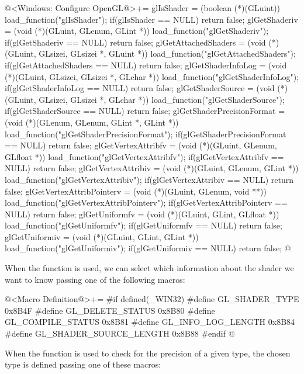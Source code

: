 \iniciocodigo
@<Windows: Configure OpenGL@>+=
glIsShader = (boolean (*)(GLuint)) load_function("glIsShader");
if(glIsShader == NULL) return false;
glGetShaderiv = (void (*)(GLuint, GLenum, GLint *))
                   load_function("glGetShaderiv");
if(glGetShaderiv == NULL) return false;
glGetAttachedShaders = (void (*)(GLuint, GLsizei, GLsizei *, GLuint *))
                         load_function("glGetAttachedShaders");
if(glGetAttachedShaders == NULL) return false;
glGetShaderInfoLog = (void (*)(GLuint, GLsizei, GLsizei *, GLchar *))
                         load_function("glGetShaderInfoLog");
if(glGetShaderInfoLog == NULL)  return false;
glGetShaderSource = (void (*)(GLuint, GLsizei, GLsizei *, GLchar *))
                       load_function("glGetShaderSource");
if(glGetShaderSource == NULL) return false;
glGetShaderPrecisionFormat = (void (*)(GLenum, GLenum, GLint *, GLint *))
                                load_function("glGetShaderPrecisionFormat");
if(glGetShaderPrecisionFormat == NULL) return false;
glGetVertexAttribfv = (void (*)(GLuint, GLenum, GLfloat *))
                         load_function("glGetVertexAttribfv");
if(glGetVertexAttribfv == NULL) return false;
glGetVertexAttribiv = (void (*)(GLuint, GLenum, GLint *))
                        load_function("glGetVertexAttribiv");
if(glGetVertexAttribiv == NULL) return false;
glGetVertexAttribPointerv = (void (*)(GLuint, GLenum, void **))
                               load_function("glGetVertexAttribPointerv");
if(glGetVertexAttribPointerv == NULL) return false;
glGetUniformfv = (void (*)(GLuint, GLint, GLfloat *))
                     load_function("glGetUniformfv");
if(glGetUniformfv == NULL) return false;
glGetUniformiv = (void (*)(GLuint, GLint, GLint *))
                     load_function("glGetUniformiv");
if(glGetUniformiv == NULL) return false;
@
\fimcodigo

When the function  is used, we can select
which information about the shader we want to know passing one of the
following macros:

\iniciocodigo
@<Macro Definition@>+=
#if defined(_WIN32)
#define GL_SHADER_TYPE          0x8B4F
#define GL_DELETE_STATUS        0x8B80
#define GL_COMPILE_STATUS       0x8B81
#define GL_INFO_LOG_LENGTH      0x8B84
#define GL_SHADER_SOURCE_LENGTH 0x8B88
#endif
@
\fimcodigo

When the function  is used to
check for the precision of a given type, the chosen type is defined
passing one of these macros:


